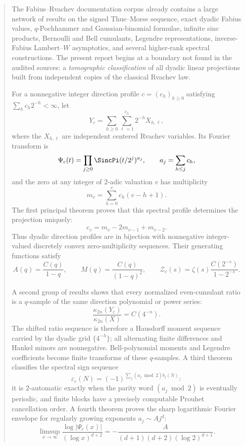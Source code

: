 \documentclass[11pt]{article}
\numberwithin{equation}{section}
\theoremstyle{definition}
\theoremstyle{remark}
\begin{document}
\begin{abstract}
The Fabius--Rvachev documentation corpus already contains a large network of
results on the signed Thue--Morse sequence, exact dyadic Fabius values,
$q$-Pochhammer and Gaussian-binomial formulae, infinite sinc products,
Bernoulli and Bell cumulants, Legendre representations, inverse-Fabius
Lambert--$W$ asymptotics, and several higher-rank spectral constructions.  The
present report begins at a boundary not found in the audited sources: a
\emph{tomographic classification} of all dyadic linear projections built from
independent copies of the classical Rvachev law.

For a nonnegative integer direction profile $c=(c_h)_{h\ge0}$ satisfying
$\sum_hc_h2^{-h}<\infty$, let
\[
 Y_c=\sum_{h\ge0}\sum_{\ell=1}^{c_h}2^{-h}X_{h,\ell},
\]
where the $X_{h,\ell}$ are independent centered Rvachev variables.  Its
Fourier transform is
\[
 \Psi_c(t)=\prod_{j\ge0}\SincPi(t/2^j)^{a_j},
 \qquad a_j=\sum_{h\le j}c_h,
\]
and the zero at any integer of $2$-adic valuation $v$ has multiplicity
\[
 m_v=\sum_{h=0}^{v}c_h(v-h+1).
\]
The first principal theorem proves that this spectral profile determines the
projection uniquely:
\[
 c_v=m_v-2m_{v-1}+m_{v-2}.
\]
Thus dyadic direction profiles are in bijection with nonnegative
integer-valued discretely convex zero-multiplicity sequences.  Their generating
functions satisfy
\[
 A(q)=\frac{C(q)}{1-q},\qquad
 M(q)=\frac{C(q)}{(1-q)^2},\qquad
 \mathcal Z_c(s)=\zeta(s)\frac{C(2^{-s})}{1-2^{-s}}.
\]

A second group of results shows that every normalized even-cumulant ratio is a
$q$-sample of the same direction polynomial or power series:
\[
 \frac{\kappa_{2n}(Y_c)}{\kappa_{2n}(X)}=C(4^{-n}).
\]
The shifted ratio sequence is therefore a Hausdorff moment sequence carried by
the dyadic grid $\{4^{-h}\}$; all alternating finite differences and Hankel
minors are nonnegative.  Bell-polynomial moments and Legendre coefficients
become finite transforms of these $q$-samples.  A third theorem classifies the
spectral sign sequence
\[
 \varepsilon_c(N)=(-1)^{\sum_j(a_j\bmod2)b_j(N)}:
\]
it is $2$-automatic exactly when the parity word $(a_j\bmod2)$ is eventually
periodic, and finite blocks have a precisely computable Prouhet cancellation
order.  A fourth theorem proves the sharp logarithmic Fourier envelope for
regularly growing exponents $a_j\sim A j^d$:
\[
 \limsup_{x\to\infty}\frac{\log|\Psi_c(x)|}{(\log x)^{d+2}}
 =-\frac{A}{(d+1)(d+2)(\log2)^{d+1}}.
\]


\end{abstract}
\end{document}
